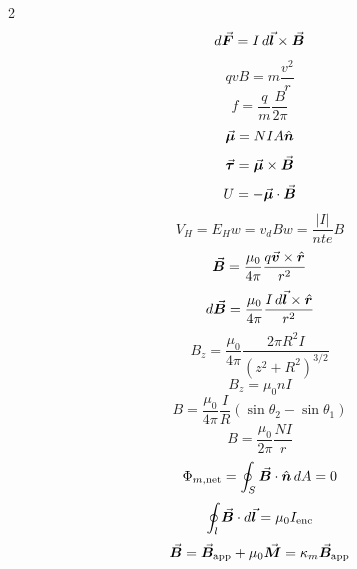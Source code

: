 \begin{multicols*}{2}
\begin{equation*}
    d\vec{\bm{F}} = I\,d\vec{\bm{l}} \times \vec{\bm{B}}
\end{equation*}
\begin{equation*}
    qvB = m \frac{v^2}{r}
\end{equation*}
\begin{equation*}
    f = \frac{q}{m}\frac{B}{2\pi}
\end{equation*}
\begin{equation*}
    \vec{\bm{\mu}} = N I A \hat{\bm{n}}
\end{equation*}
\begin{equation*}
    \vec{\bm{\tau}} = \vec{\bm{\mu}} \times \vec{\bm{B}}
\end{equation*}
\begin{equation*}
    U = -\vec{\bm{\mu}} \cdot \vec{\bm{B}}
\end{equation*}
\begin{equation*}
    V_H = E_H w = v_d B w = \frac{|I|}{nte}B
\end{equation*}
\begin{equation*}
    \vec{\bm{B}} = \frac{\mu_0}{4\pi} \frac{q\vec{\bm{v}}\times\hat{\bm{r}}}{r^2}
\end{equation*}
\begin{equation*}
    d\vec{\bm{B}} = \frac{\mu_0}{4\pi} \frac{I\,d\vec{\bm{l}}\times\hat{\bm{r}}}{r^2}
\end{equation*}
\begin{equation*}
    B_z = \frac{\mu_0}{4\pi} \frac{2\pi R^2 I}{\left(z^2 + R^2\right)^{3/2}}
\end{equation*}
\begin{equation*}
    B_z = \mu_0 n I
\end{equation*}
\begin{equation*}
    B = \frac{\mu_0}{4\pi} \frac{I}{R} \left( \sin\theta_2 - \sin\theta_1 \right)
\end{equation*}
\begin{equation*}
    B = \frac{\mu_0}{2\pi} \frac{NI}{r}
\end{equation*}
\begin{equation*}
    \Phi_{m,\mathrm{net}} = \oint_S \vec{\bm{B}}\cdot\hat{\bm{n}}\,dA = 0
\end{equation*}
\begin{equation*}
    \oint_l \vec{\bm{B}} \cdot d\vec{\bm{l}} = \mu_0 I_\mathrm{enc}
\end{equation*}
\begin{equation*}
    \bvec{B} = \bvec{B}_\mathrm{app} + \mu_0 \bvec{M} = \kappa_m \bvec{B}_\mathrm{app}

\end{equation*}
\end{multicols*}

